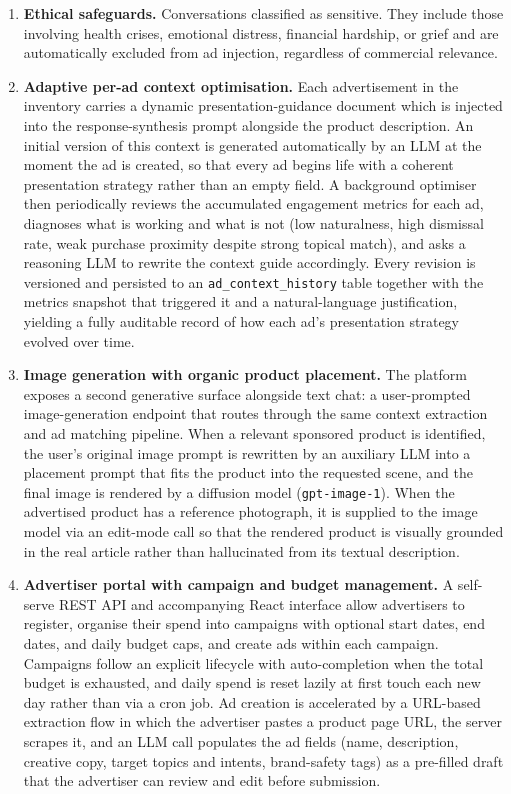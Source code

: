 \begin{enumerate}[label=(\roman*), leftmargin=2.5em]
  \item \textbf{Ethical safeguards.} Conversations classified as sensitive. They include those
    involving health crises, emotional distress, financial hardship, or
    grief and are automatically excluded from ad injection, regardless of
    commercial relevance.

  \item \textbf{Adaptive per-ad context optimisation.} Each advertisement in
    the inventory carries a dynamic presentation-guidance document which is injected into the response-synthesis prompt
    alongside the product description. An initial version of this context is
    generated automatically by an LLM at the moment the ad is created, so that
    every ad begins life with a coherent presentation strategy rather than an
    empty field. A background optimiser then periodically reviews the
    accumulated engagement metrics for each ad, diagnoses what is working and
    what is not (low naturalness, high dismissal rate, weak purchase proximity
    despite strong topical match), and asks a reasoning LLM to rewrite the
    context guide accordingly. Every revision is versioned and persisted to an
    \texttt{ad\_context\_history} table together with the metrics snapshot that
    triggered it and a natural-language justification, yielding a fully
    auditable record of how each ad's presentation strategy evolved over time.

  \item \textbf{Image generation with organic product placement.} The platform
    exposes a second generative surface alongside text chat: a user-prompted
    image-generation endpoint that routes through the same context extraction
    and ad matching pipeline. When a relevant sponsored product is identified,
    the user's original image prompt is rewritten by an auxiliary LLM into a
    placement prompt that fits the product into the requested scene, and the
    final image is rendered by a diffusion model (\texttt{gpt-image-1}). When
    the advertised product has a reference photograph, it is supplied to the
    image model via an edit-mode call so that the rendered product is visually
    grounded in the real article rather than hallucinated from its textual
    description.

  \item \textbf{Advertiser portal with campaign and budget management.} A
    self-serve REST API and accompanying React interface allow advertisers
    to register, organise their spend into campaigns with optional start
    dates, end dates, and daily budget caps, and create ads within each
    campaign. Campaigns follow an explicit lifecycle with
    auto-completion when the total budget is exhausted, and daily spend is
    reset lazily at first touch each new day rather than via a cron job.
    Ad creation is accelerated by a URL-based extraction flow in which the
    advertiser pastes a product page URL, the server scrapes it, and an LLM
    call populates the ad fields (name, description, creative copy, target
    topics and intents, brand-safety tags) as a pre-filled draft that the
    advertiser can review and edit before submission.


\end{enumerate}
